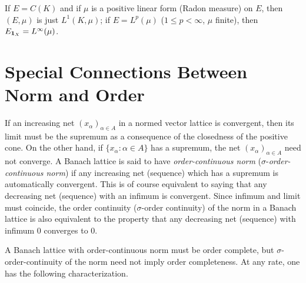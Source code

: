 If\/ $ E = C(K) $ and if\/ $ \mu $ is a positive linear form (Radon measure) on $ E $, then $ (E,\mu) $ is just $ L^{1}(K,\mu) $;
if\/ $ E = L^{p}(\mu) $ ($ 1 \leq p < \infty $, $ \mu $ finite), then $ E_{\mathbf{1}_{X}} = L^{\infty}(\mu) $.
\section{Special Connections Between Norm and Order}\label{sec:c1-5}%
If an increasing net $ (x_{\alpha})_{\alpha\in A} $ in a normed vector lattice is convergent, then its limit must be the supremum as a consequence of the closedness of the positive cone.
On the other hand, if\/ $ \{x_{\alpha} \colon \alpha \in A\} $ has a supremum, the net $ (x_{\alpha})_{\alpha\in A} $ need not converge.
A Banach lattice is said to have \emph{order-continuous norm} ($ \sigma $-\emph{order-continuous norm}) if any increasing net (sequence) which has a supremum is automatically convergent.
This is of course equivalent to saying that any decreasing net (sequence) with an infimum is convergent.
Since infimum and limit must coincide, the order continuity ($ \sigma $-order continuity) of the norm in a Banach lattice is also equivalent to the property that any decreasing net (sequence) with infimum $ 0 $ converges to $ 0 $.

A Banach lattice with order-continuous norm must be order complete, but $ \sigma $-order-continuity of the norm need not imply order completeness.
At any rate, one has the following characterization.

